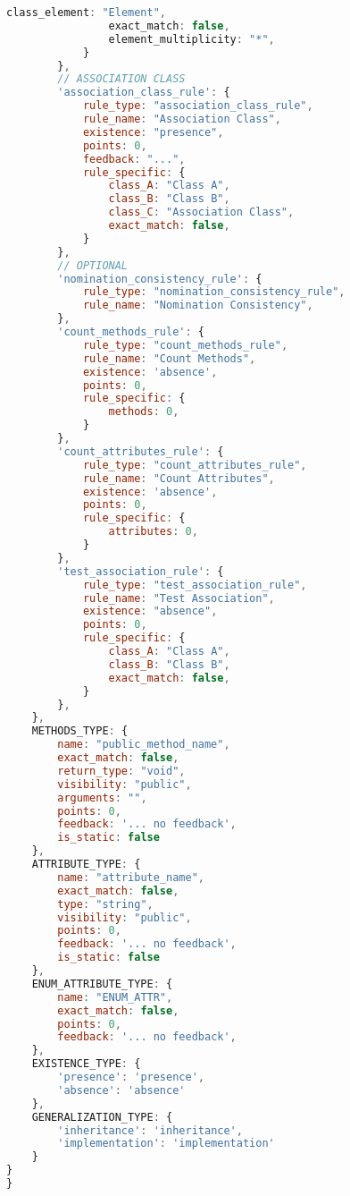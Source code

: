 \begin{lstlisting}[caption={Rules Definition JSON}, label={lst:rules_def}, language=javascript]
                class_element: "Element",
                exact_match: false,
                element_multiplicity: "*",
            }
        },
        // ASSOCIATION CLASS
        'association_class_rule': {
            rule_type: "association_class_rule",
            rule_name: "Association Class",
            existence: "presence",
            points: 0,
            feedback: "...",
            rule_specific: {
                class_A: "Class A",
                class_B: "Class B",
                class_C: "Association Class",
                exact_match: false,
            }
        },
        // OPTIONAL
        'nomination_consistency_rule': {
            rule_type: "nomination_consistency_rule",
            rule_name: "Nomination Consistency",
        },
        'count_methods_rule': {
            rule_type: "count_methods_rule",
            rule_name: "Count Methods",
            existence: 'absence',
            points: 0,
            rule_specific: {
                methods: 0,
            }
        },
        'count_attributes_rule': {
            rule_type: "count_attributes_rule",
            rule_name: "Count Attributes",
            existence: 'absence',
            points: 0,
            rule_specific: {
                attributes: 0,
            }
        },
        'test_association_rule': {
            rule_type: "test_association_rule",
            rule_name: "Test Association",
            existence: "absence",
            points: 0,
            rule_specific: {
                class_A: "Class A",
                class_B: "Class B",
                exact_match: false,
            }
        },
    },
    METHODS_TYPE: {
        name: "public_method_name",
        exact_match: false,
        return_type: "void",
        visibility: "public",
        arguments: "",
        points: 0,
        feedback: '... no feedback',
        is_static: false
    },
    ATTRIBUTE_TYPE: {
        name: "attribute_name",
        exact_match: false,
        type: "string",
        visibility: "public",
        points: 0,
        feedback: '... no feedback',
        is_static: false
    },
    ENUM_ATTRIBUTE_TYPE: {
        name: "ENUM_ATTR",
        exact_match: false,
        points: 0,
        feedback: '... no feedback',
    },
    EXISTENCE_TYPE: {
        'presence': 'presence',
        'absence': 'absence'
    },
    GENERALIZATION_TYPE: {
        'inheritance': 'inheritance',
        'implementation': 'implementation'
    }
}
}
\end{lstlisting}


\newpage
